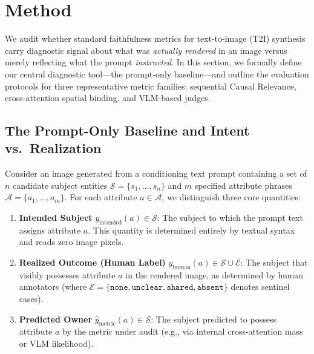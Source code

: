 
\section{Method}
\label{sec:method}

We audit whether standard faithfulness metrics for text-to-image (T2I) synthesis carry diagnostic signal about what was \emph{actually rendered} in an image versus merely reflecting what the prompt \emph{instructed}. In this section, we formally define our central diagnostic tool---the prompt-only baseline---and outline the evaluation protocols for three representative metric families: sequential Causal Relevance, cross-attention spatial binding, and VLM-based judges.

\subsection{The Prompt-Only Baseline and Intent vs.\ Realization}
\label{sec:method_baseline}

Consider an image generated from a conditioning text prompt containing a set of $n$ candidate subject entities $\mathcal{S} = \{s_1, \dots, s_n\}$ and $m$ specified attribute phrases $\mathcal{A} = \{a_1, \dots, a_m\}$. For each attribute $a \in \mathcal{A}$, we distinguish three core quantities:
\begin{enumerate}[leftmargin=*,itemsep=1pt,topsep=2pt]
    \item \textbf{Intended Subject} $y_{\text{intended}}(a) \in \mathcal{S}$: The subject to which the prompt text assigns attribute $a$. This quantity is determined entirely by textual syntax and reads zero image pixels.
    \item \textbf{Realized Outcome (Human Label)} $y_{\text{human}}(a) \in \mathcal{S} \cup \mathcal{E}$: The subject that visibly possesses attribute $a$ in the rendered image, as determined by human annotators (where $\mathcal{E} = \{\texttt{none}, \texttt{unclear}, \texttt{shared}, \texttt{absent}\}$ denotes sentinel cases).
    \item \textbf{Predicted Owner} $\hat{y}_{\text{metric}}(a) \in \mathcal{S}$: The subject predicted to possess attribute $a$ by the metric under audit (e.g., via internal cross-attention mass or VLM likelihood).
\end{enumerate}

